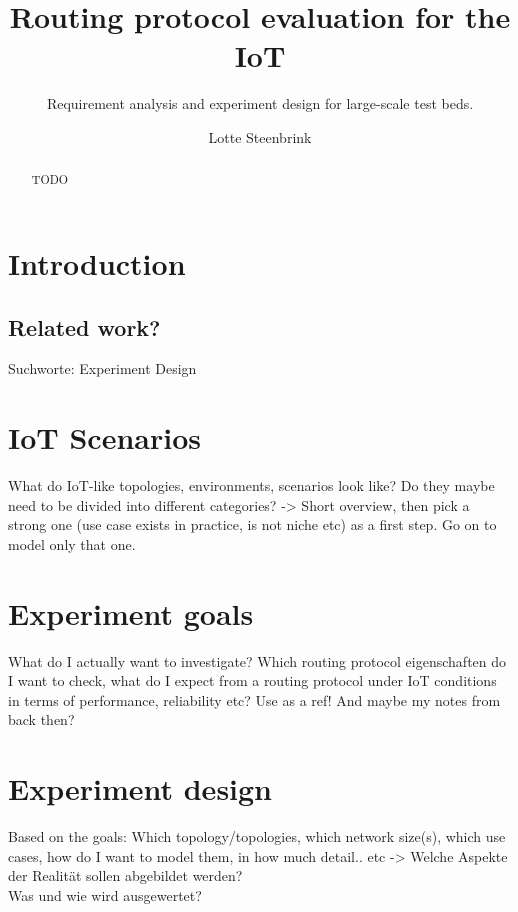 \documentclass{acm_proc_article-sp}
\begin{document}
\title{Routing protocol evaluation for the IoT}
\subtitle{Requirement analysis and experiment design for large-scale test beds.}

\author{
\alignauthor
Lotte Steenbrink
}

\maketitle
\begin{abstract}
TODO
\end{abstract}


\section{Introduction}
\label{sec:Intro}


\subsection{Related work?}
\label{subsec:realted_work}
Suchworte: Experiment Design


\section{IoT Scenarios}
\label{sec:Scenarios}
What do IoT-like topologies, environments, scenarios look like? Do they maybe need to be divided into different categories?
-> Short overview, then pick a strong one (use case exists in practice, is not niche etc) as a first step. Go on to model only that one.


\section{Experiment goals}
\label{sec:Goals}
What do I actually want to investigate? Which routing protocol eigenschaften do I want to check, what do I expect from a routing protocol under IoT conditions in terms of performance, reliability etc?
Use \cite{RFC2501} as a ref! And maybe my notes from back then?

\section{Experiment design}
\label{sec:Design}
Based on the goals: Which topology/topologies, which network size(s), which use cases, how do I want to model them, in how much detail.. etc -> Welche Aspekte der Realität sollen abgebildet werden?\\
Was und wie wird ausgewertet?
\end{document}
